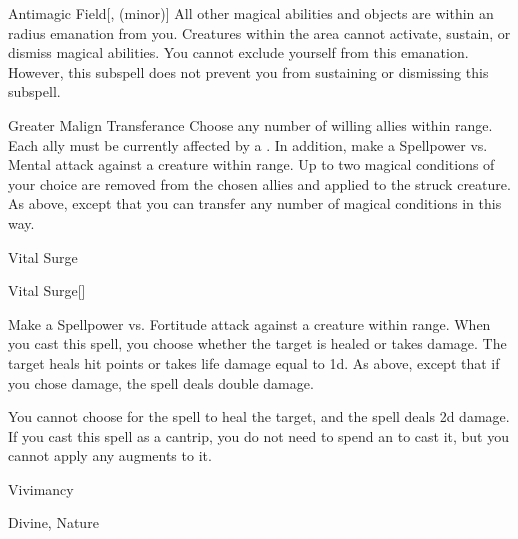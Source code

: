 \begin{ability}[\nth{7}]{Antimagic Field}[,  (minor)]
All other magical abilities and objects are  within an \areasmall radius emanation from you.
Creatures within the area cannot activate, sustain, or dismiss magical abilities.
You cannot exclude yourself from this emanation.
However, this subspell does not prevent you from sustaining or dismissing this subspell.
\end{ability}
\vspace{0.25em}


\begin{ability}[\nth{7}]{Greater Malign Transferance}
Choose any number of willing allies within \rngmed range.
Each ally must be currently affected by a  .
In addition, make a Spellpower vs. Mental attack against a creature within \rngmed range.
\hit Up to two magical conditions of your choice are removed from the chosen allies and applied to the struck creature.
\crit As above, except that you can transfer any number of magical conditions in this way.
\end{ability}
\vspace{0.25em}

\newpage
\begin{spellsection}{Vital Surge}


\begin{ability}{Vital Surge}[]

Make a Spellpower vs. Fortitude attack against a creature within \rngmed range.
When you cast this spell, you choose whether the target is healed or takes damage.
\hit The target heals hit points or takes life damage equal to  \plus1d.
\crit As above, except that if you chose damage, the spell deals double damage.

\end{ability}



 You cannot choose for the spell to heal the target, and the spell deals \minus2d damage. If you cast this spell as a cantrip,
you do not need to spend an  to cast it,
but you cannot apply any augments to it.


 Vivimancy

 Divine, Nature
\end{spellsection}


